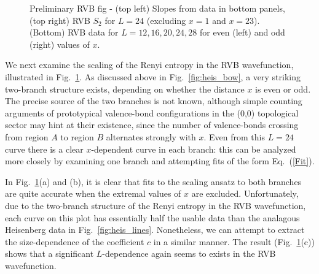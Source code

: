 \documentclass[prl,aps,twocolumn,floatfix,amsmath,amssymb,superscriptaddress,tightenlines]{revtex4}
\begin{document}
 \begin{figure}
   \begin{center}
   \end{center}
   \caption{Preliminary RVB fig - (top left) Slopes from data in bottom panels, (top right) RVB $S_2$ for $L=24$ (excluding $x=1$ and $x=23$). (Bottom) RVB data for $L=12,16,20,24,28$ for even (left) and odd (right) values of $x$.}
   \label{fig:2}
 \end{figure}

We next examine the scaling of the Renyi entropy in the RVB wavefunction, illustrated in Fig.~{\ref{fig:2}}.  
As discussed above in Fig.~\ref{fig:heis_bow}, a very striking two-branch structure exists, depending on whether the distance $x$ is even or odd.
The precise source of the two branches is not known, although simple counting arguments of prototypical valence-bond configurations in the (0,0) topological \cite{RVB1,RVB2} sector may hint at their existence, since the number of valence-bonds crossing from region $A$ to region $B$ alternates strongly with $x$.  Even from this $L=24$ curve there is a clear $x$-dependent curve in each branch: this can be analyzed more closely by examining one branch and attempting fits of the form Eq.~(\ref{Fit}).  

In Fig.~{\ref{fig:2}}(a) and (b), it is clear that fits to the scaling ansatz to both branches are quite accurate when the extremal values of $x$ are excluded.   Unfortunately, due to the two-branch structure of the Renyi entropy in the RVB wavefunction, each curve on this plot has essentially half the usable data than the analagous Heisenberg data in Fig.~\ref{fig:heis_lines}.  Nonetheless, we can attempt to extract the size-dependence of the coefficient $c$ in a similar manner.  The result (Fig.~\ref{fig:2}(c)) shows that a significant $L$-dependence again seems to exists in the RVB wavefunction. 
\end{document}
